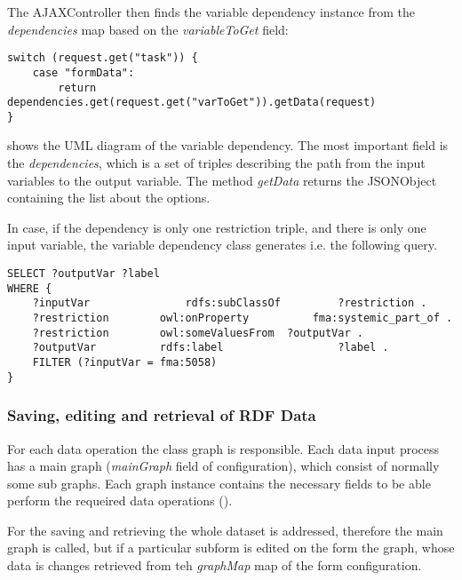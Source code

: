The AJAXController then finds the variable dependency instance from the \textit{dependencies} map based on the \textit{variableToGet} field:

\begin{lstlisting}[basicstyle=\footnotesize, frame=single, caption={Loading form data from FormConfiguration}, label=serveRequest, captionpos=b, belowskip=1em, aboveskip=1em]
switch (request.get("task")) {
	case "formData": 
		return dependencies.get(request.get("varToGet")).getData(request)		
}
\end{lstlisting}

 shows the UML diagram of the variable dependency. The most important field is the \textit{dependencies}, which is a set of triples describing the path from the input variables to the output variable. The method \textit{getData} returns the JSONObject containing the list about the options.


In case, if the dependency is only one restriction triple, and there is only one input variable, the variable dependency class generates i.e. the following query.

\begin{lstlisting}[basicstyle=\footnotesize, frame=single, caption={SPARQL query generated by class restriction triple}, label=JS_subFormRoutine, captionpos=b, belowskip=1em, aboveskip=2em]
SELECT ?outputVar ?label 
WHERE {
	?inputVar				rdfs:subClassOf			?restriction .
	?restriction		owl:onProperty			fma:systemic_part_of .
	?restriction		owl:someValuesFrom	?outputVar .
	?outputVar			rdfs:label					?label .	
	FILTER (?inputVar = fma:5058)
}
\end{lstlisting}

\newpage
\subsubsection{Saving, editing and retrieval of RDF Data}

For each data operation the class graph is responsible. Each data input process has a main graph (\textit{mainGraph} field of configuration), which consist of normally some sub graphs. Each graph instance contains the necessary fields to be able perform the requeired data operations (). 


For the saving and retrieving the whole dataset is addressed, therefore the main graph is called, but if a particular subform is edited on the form the graph, whose data is changes retrieved from teh \textit{graphMap} map of the form configuration. 

